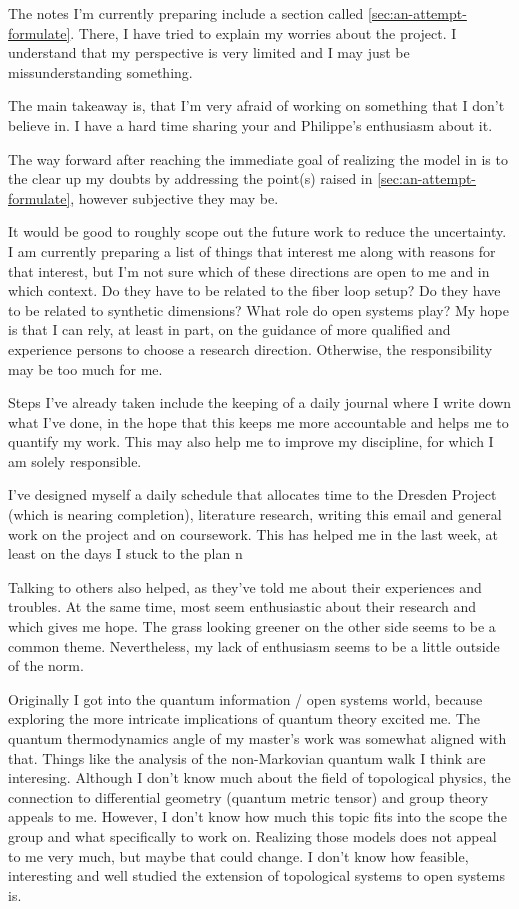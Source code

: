 \documentclass[fontsize=10pt,paper=a4,open=any,
twoside=no,toc=listof,toc=bibliography,headings=optiontohead,
captions=nooneline,captions=tableabove,english,DIV=15,numbers=noenddot,final,parskip=half-,
headinclude=true,footinclude=false,BCOR=0mm]{scrartcl}
\begin{document}
The notes I'm currently preparing include a section called
\cref{sec:an-attempt-formulate}. There, I have tried to explain my
worries about the project. I understand that my perspective is very
limited and I may just be missunderstanding something.

The main takeaway is, that I'm very afraid of working on something
that I don't believe in. I have a hard time sharing your and
Philippe's enthusiasm about it.

The way forward after reaching the immediate goal of realizing the
model in  is to the clear up my doubts by
addressing the point(s) raised in \cref{sec:an-attempt-formulate},
however subjective they may be.

It would be good to roughly scope out the future work to reduce the
uncertainty. I am currently preparing a list of things that interest
me along with reasons for that interest, but I'm not sure which of
these directions are open to me and in which context. Do they have to
be related to the fiber loop setup? Do they have to be related to
synthetic dimensions?  What role do open systems play? My hope is that
I can rely, at least in part, on the guidance of more qualified and
experience persons to choose a research direction. Otherwise, the
responsibility may be too much for me.

Steps I've already taken include the keeping of a daily journal where
I write down what I've done, in the hope that this keeps me more
accountable and helps me to quantify my work. This may also help me to
improve my discipline, for which I am solely responsible.

I've designed myself a daily schedule that allocates time to the
Dresden Project (which is nearing completion), literature research,
writing this email and general work on the project and on
coursework. This has helped me in the last week, at least on the days
I stuck to the plan ^^.

Talking to others also helped, as they've told me about their
experiences and troubles. At the same time, most seem enthusiastic
about their research and which gives me hope. The grass looking
greener on the other side seems to be a common theme. Nevertheless, my
lack of enthusiasm seems to be a little outside of the norm.

Originally I got into the quantum information / open systems world,
because exploring the more intricate implications of quantum theory
excited me. The quantum thermodynamics angle of my master's work was
somewhat aligned with that. Things like the analysis of the
non-Markovian quantum walk I think are interesing. Although I don't
know much about the field of topological physics, the connection to
differential geometry (quantum metric tensor) and group theory appeals
to me. However, I don't know how much this topic fits into the scope
the group and what specifically to work on. Realizing those models
does not appeal to me very much, but maybe that could change. I don't
know how feasible, interesting and well studied the extension of
topological systems to open systems is.
\end{document}
